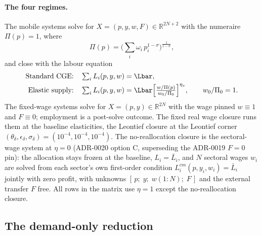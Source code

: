 \paragraph{The four regimes.} The mobile systems solve for
$X = (p, y, w, F) \in \mathbb{R}^{2N+2}$ with the numeraire
$\Pi(p) = 1$, where
\begin{equation}
\Pi(p) = \Big( \textstyle\sum_i \omega_i\, p_i^{1-\sigma}
   \Big)^{\frac{1}{1-\sigma}},
\label{eq:cpi}
\end{equation}
and close with the labour equation
\begin{align}
\text{Standard CGE:}\quad & \textstyle\sum_i L_i(p,y,w) = \Lbar,
\label{eq:alpha}\\
\text{Elastic supply:}\quad & \textstyle\sum_i L_i(p,y,w)
   = \Lbar \Big[ \frac{w/\Pi(p)}{w_0/\Pi_0} \Big]^{\eta_s},
\qquad w_0/\Pi_0 = 1.
\label{eq:beta}
\end{align}
The fixed-wage systems solve for $X = (p, y) \in \mathbb{R}^{2N}$ with the
wage pinned $w \equiv 1$ and $F \equiv 0$; employment is a post-solve
outcome. The fixed real wage closure runs them at the baseline elasticities,
the Leontief closure at the Leontief
corner $(\theta_\delta,\epsilon_\delta,\sigma_\delta) = (10^{-4},10^{-4},
10^{-4})$. The no-reallocation closure is the sectoral-wage system at
$\eta = 0$ (ADR-0020 option C, superseding the ADR-0019 $F = 0$ pin): the
allocation stays frozen at the baseline, $L_i = \bar{L}_i$, and $N$ sectoral
wages $w_i$ are solved from each sector's own first-order condition
$L^{cm}_i(p, y_i, w_i) = \bar{L}_i$ jointly with zero profit, with unknowns
$[\,p;\; y;\; w(1{:}N);\; F\,]$ and the external transfer $F$ free. All rows
in the matrix use $\eta = 1$ except the no-reallocation closure.

\subsection{The demand-only reduction}\label{sec:reduction}

